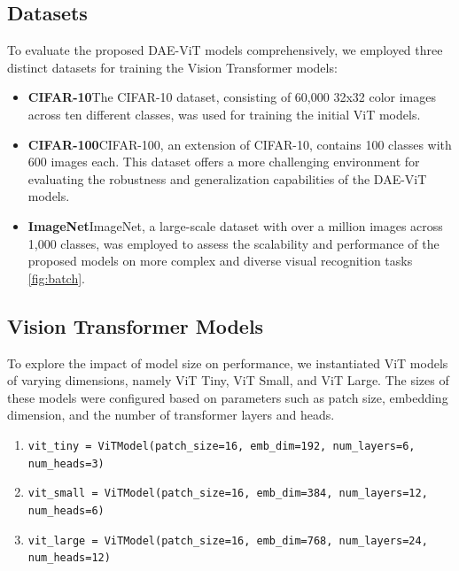 \documentclass[10pt,twocolumn]{IEEEtran}
\begin{document}
\subsection{Datasets}
To evaluate the proposed DAE-ViT models comprehensively, we employed three distinct datasets for training the Vision Transformer models:
\begin{itemize}
    \item \textbf{CIFAR-10}The CIFAR-10 dataset, consisting of 60,000 32x32 color images across ten different classes, was used for training the initial ViT models.
    \item \textbf{CIFAR-100}CIFAR-100, an extension of CIFAR-10, contains 100 classes with 600 images each. This dataset offers a more challenging environment for evaluating the robustness and generalization capabilities of the DAE-ViT models.
    \item \textbf{ImageNet}ImageNet, a large-scale dataset with over a million images across 1,000 classes, was employed to assess the scalability and performance of the proposed models on more complex and diverse visual recognition tasks \ref{fig:batch}.
\end{itemize}

\subsection{Vision Transformer Models}
To explore the impact of model size on performance, we instantiated ViT models of varying dimensions, namely ViT Tiny, ViT Small, and ViT Large. The sizes of these models were configured based on parameters such as patch size, embedding dimension, and the number of transformer layers and heads.
\begin{enumerate}
    \item \texttt{vit\_tiny = ViTModel(patch\_size=16, emb\_dim=192, num\_layers=6, num\_heads=3)}
    \item \texttt{vit\_small = ViTModel(patch\_size=16, emb\_dim=384, num\_layers=12, num\_heads=6)}
    \item \texttt{vit\_large = ViTModel(patch\_size=16, emb\_dim=768, num\_layers=24, num\_heads=12)}
\end{enumerate}
\end{document}
